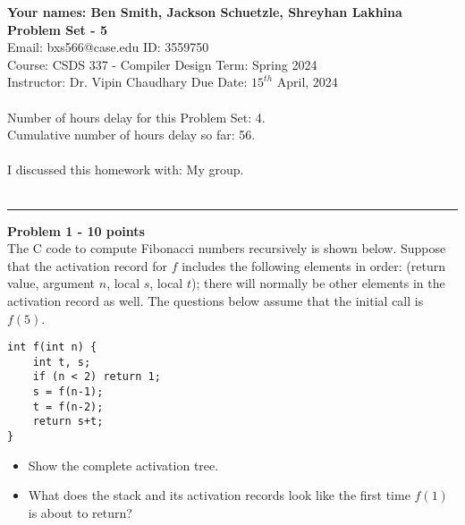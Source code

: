 \documentclass[a4paper, 11pt]{article}
\newenvironment{problem}[2][Problem]
    { \begin{mdframed}[backgroundcolor=gray!20] \textbf{#1 #2} \\}
    {  \end{mdframed}}
\begin{document}
\noindent
\large\textbf{Your names: Ben Smith, Jackson Schuetzle, Shreyhan Lakhina} \hfill \textbf{Problem Set - 5}   \\
Email: bxs566@case.edu \hfill ID: 3559750 \\
\normalsize Course: CSDS 337 - Compiler Design \hfill Term: Spring 2024\\
Instructor: Dr. Vipin Chaudhary \hfill Due Date: $15^{th}$ April, 2024 \\ \\
Number of hours delay for this Problem Set: \hfill 4.\\
Cumulative number of hours delay so far: \hfill 56. \\ \\
I discussed this homework with: \hfill My group. \\ \\

\noindent\rule{7in}{2.8pt}



\begin{problem}{1 - 10 points}
The C code to compute Fibonacci numbers recursively is shown below. Suppose that the activation record for $f$ includes the following elements  in order: (return value, argument $n$, local $s$, local $t$); there will normally be  other elements in the activation record as well. The questions below assume  that the initial call is $f(5)$.  

\begin{verbatim}
int f(int n) {  
    int t, s;  
    if (n < 2) return 1;  
    s = f(n-1);  
    t = f(n-2);  
    return s+t;  
} 

\end{verbatim}
\begin{itemize}[a]
    \item Show the complete activation tree.  
    \item What does the stack and its activation records look like the first time $f(1)$  is about to return?   
    
\end{itemize}

\end{problem}
\end{document}
